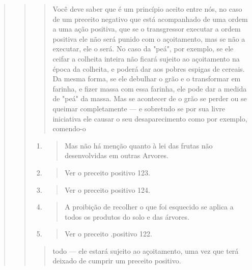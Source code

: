 \begin{quote}
\begin{quote}
\begin{quote}
Você deve saber que é um princípio aceito entre nós, no caso de um
preceito negativo que está acompanhado de uma ordem a uma ação positiva,
que se o transgressor executar a ordem positiva ele não será punido com
o açoitamento, mas se não a executar, ele o será. No caso da "peá", por
exemplo, se ele ceifar a colheita inteira não ficará sujeito ao
açoitamento na época da colheita, e poderá dar aos pobres espigas de
cereais. Da mesma for­ma, se ele debulhar o grão e o transformar em
farinha, e fizer massa com essa farinha, ele pode dar a medida de "peá"
da massa. Mas se acontecer de o grão se perder ou se queimar
completamente --- e sobretudo se por sua livre iniciativa ele causar o
seu desaparecimento como por exemplo, comendo-o
\end{quote}

\begin{enumerate}
\def\labelenumi{\arabic{enumi}.}
\setcounter{enumi}{379}
\item
 \begin{quote}
 Mas não há menção quanto à lei das frutas não desenvolvidas em outras
 Arvores.
 \end{quote}
\item
 \begin{quote}
 Ver o preceito positivo 123.
 \end{quote}
\item
 \begin{quote}
 Ver o preceito positivo 124.
 \end{quote}
\item
 \begin{quote}
 A proibição de recolher o que foi esquecido se aplica a todos os
 produtos do solo e das árvores.
 \end{quote}
\item
 \begin{quote}
 Ver o preceito .positivo 122.
 \end{quote}
\end{enumerate}

\begin{quote}todo --- ele estará sujeito ao açoitamento, uma vez que terá deixado de
cumprir um preceito positivo.


\end{quote}
\end{quote}
\end{quote}
